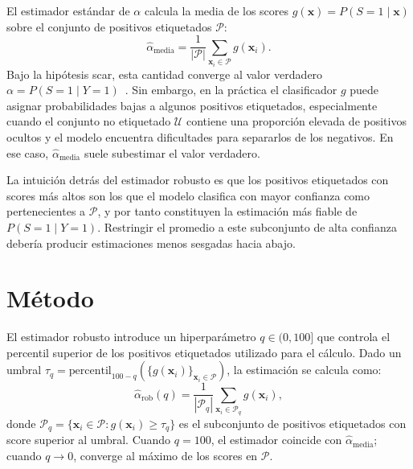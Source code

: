 El estimador estándar de $\alpha$ calcula la media de los scores $g(\mathbf{x}) = P(S=1 \mid \mathbf{x})$ sobre el conjunto de positivos etiquetados $\mathcal{P}$:
\begin{equation}
  \hat{\alpha}_{\text{media}} = \frac{1}{|\mathcal{P}|} \sum_{\mathbf{x}_i \in \mathcal{P}} g(\mathbf{x}_i).
  \label{eq:alpha_media}
\end{equation}
Bajo la hipótesis \acrshort{scar}, esta cantidad converge al valor verdadero $\alpha = P(S=1 \mid Y=1)$~\cite{elkan2008learning}. Sin embargo, en la práctica el clasificador $g$ puede asignar probabilidades bajas a algunos positivos etiquetados, especialmente cuando el conjunto no etiquetado $\mathcal{U}$ contiene una proporción elevada de positivos ocultos y el modelo encuentra dificultades para separarlos de los negativos. En ese caso, $\hat{\alpha}_{\text{media}}$ suele subestimar el valor verdadero.

La intuición detrás del estimador robusto es que los positivos etiquetados con scores más altos son los que el modelo clasifica con mayor confianza como pertenecientes a $\mathcal{P}$, y por tanto constituyen la estimación más fiable de $P(S=1 \mid Y=1)$. Restringir el promedio a este subconjunto de alta confianza debería producir estimaciones menos sesgadas hacia abajo.

\section{Método}
\label{sec:apendice_metodo}

El estimador robusto introduce un hiperparámetro $q \in (0, 100]$ que controla el percentil superior de los positivos etiquetados utilizado para el cálculo. Dado un umbral $\tau_q = \text{percentil}_{100-q}(\{g(\mathbf{x}_i)\}_{\mathbf{x}_i \in \mathcal{P}})$, la estimación se calcula como:
\begin{equation}
  \hat{\alpha}_{\text{rob}}(q) = \frac{1}{|\mathcal{P}_q|} \sum_{\mathbf{x}_i \in \mathcal{P}_q} g(\mathbf{x}_i),
  \label{eq:alpha_robusto}
\end{equation}
donde $\mathcal{P}_q = \{\mathbf{x}_i \in \mathcal{P} : g(\mathbf{x}_i) \geq \tau_q\}$ es el subconjunto de positivos etiquetados con score superior al umbral. Cuando $q = 100$, el estimador coincide con $\hat{\alpha}_{\text{media}}$; cuando $q \to 0$, converge al máximo de los scores en $\mathcal{P}$.

